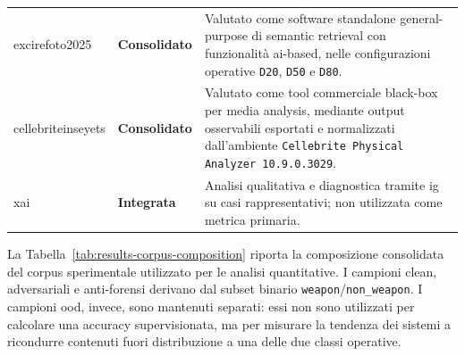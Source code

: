 \begin{table}[H]
\begin{tabularx}{\textwidth}{@{}p{} p{} X@{}}
\gls{excirefoto2025} &
\textbf{Consolidato} &
Valutato come software standalone general-purpose di semantic retrieval con
funzionalità \gls{ai}-based, nelle configurazioni operative \texttt{D20},
\texttt{D50} e \texttt{D80}. \\

\gls{cellebriteinseyets} &
\textbf{Consolidato} &
Valutato come tool commerciale black-box per media analysis, mediante output
osservabili esportati e normalizzati dall'ambiente \texttt{Cellebrite Physical
Analyzer 10.9.0.3029}. \\

\gls{xai} &
\textbf{Integrata} &
Analisi qualitativa e diagnostica tramite \gls{ig} su casi rappresentativi; non
utilizzata come metrica primaria. \\

\bottomrule
\end{tabularx}
\end{table}



La Tabella~\ref{tab:results-corpus-composition} riporta la composizione
consolidata del corpus sperimentale utilizzato per le analisi quantitative. I
campioni clean, adversariali e anti-forensi derivano dal subset binario
\texttt{weapon}/\texttt{non\_weapon}. I campioni \gls{ood}, invece, sono
mantenuti separati: essi non sono utilizzati per calcolare una accuracy
supervisionata, ma per misurare la tendenza dei sistemi a ricondurre contenuti
fuori distribuzione a una delle due classi operative.

